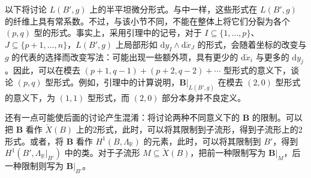 \begin{note}[numbered]\label{note:6.68}
以下将讨论 $L(B',g)$ 上的半平坦微分形式。与中一样，这些形式在 $L(B',g)$ 的纤维上具有常系数。不过，与该小节不同，不能在整体上将它们分裂为各个 $(p,q)$ 型的形式。事实上，采用引理中的记号，对于 $I\subseteq\{1,\ldots,p\}$、$J\subseteq\{p+1,\ldots,n\}$，$L(B',g)$ 上局部形如 $\mathrm dy_I\wedge\mathrm d\check x_J$ 的形式，会随着坐标的改变与 $g$ 的代表的选择而改变写法：可能出现一些额外项，具有更少的 $\mathrm d\check x_i$ 与更多的 $\mathrm dy_j$。因此，可以在模去 $(p+1,q-1)+(p+2,q-2)+\cdots$ 型形式的意义下，谈论 $(p,q)$ 型形式。例如，引理中的计算说明，$\mathbf B|_{L(B',g)}$ 在模去 $(2,0)$ 型形式的意义下，为 $(1,1)$ 型形式，而 $(2,0)$ 部分本身并不良定义。

还有一点可能使后面的讨论产生混淆：将讨论两种不同意义下的 $\mathbf B$ 的限制。可以把 $\mathbf B$ 看作 $\check X(B)$ 上的2形式，此时，可以将其限制到子流形，得到子流形上的2形式。或者，将 $\mathbf B$ 看作 $H^1(B,\Lambda_{\mathbb R})$ 的元素，此时，可以将其限制到 $B'$，得到 $H^1(B',\Lambda_{\mathbb R}|_{B'})$ 中的类。对于子流形 $M\subseteq\check X(B)$，把前一种限制写为 $\mathbf B|_M$，后一种限制则写为 $\mathbf B|_{B'}$。
\end{note}

